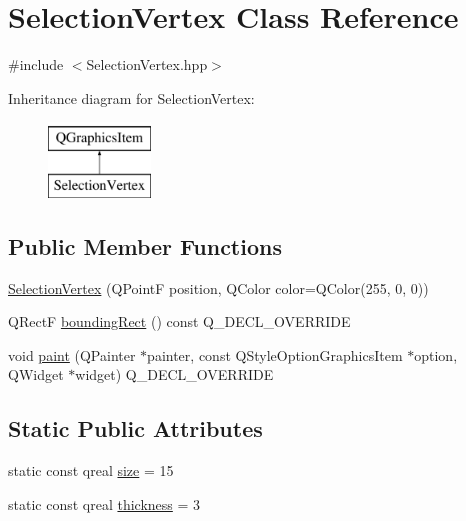 \hypertarget{class_selection_vertex}{}\section{Selection\+Vertex Class Reference}
\label{class_selection_vertex}


{\ttfamily \#include $<$Selection\+Vertex.\+hpp$>$}

Inheritance diagram for Selection\+Vertex\+:\begin{figure}[H]
\begin{center}
\leavevmode
\includegraphics[height=2.000000cm]{class_selection_vertex}
\end{center}
\end{figure}
\subsection*{Public Member Functions}
\begin{DoxyCompactItemize}
\item 
\hyperlink{class_selection_vertex_acb10ca35d56e0606acdcb9c8a6342925}{Selection\+Vertex} (Q\+Point\+F position, Q\+Color color=Q\+Color(255, 0, 0))
\item 
Q\+Rect\+F \hyperlink{class_selection_vertex_aa9b0fc297965a721b4d29e48d5b628ac}{bounding\+Rect} () const Q\+\_\+\+D\+E\+C\+L\+\_\+\+O\+V\+E\+R\+R\+I\+D\+E
\item 
void \hyperlink{class_selection_vertex_a15246935fd481899f72834fb66b1314b}{paint} (Q\+Painter $\ast$painter, const Q\+Style\+Option\+Graphics\+Item $\ast$option, Q\+Widget $\ast$widget) Q\+\_\+\+D\+E\+C\+L\+\_\+\+O\+V\+E\+R\+R\+I\+D\+E
\end{DoxyCompactItemize}
\subsection*{Static Public Attributes}
\begin{DoxyCompactItemize}
\item 
static const qreal \hyperlink{class_selection_vertex_a618a13a2140b769bb44d4a8324d934fd}{size} = 15
\item 
static const qreal \hyperlink{class_selection_vertex_a8360abe25bea5202a7479637c30d60af}{thickness} = 3
\end{DoxyCompactItemize}


